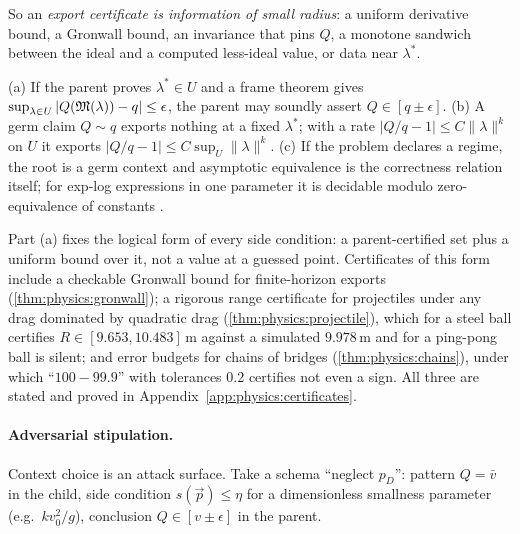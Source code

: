 So an \emph{export certificate is information of small radius}: a uniform derivative
bound, a Gronwall bound, an invariance that pins $Q$, a monotone sandwich between the
ideal and a computed less-ideal value, or data near $\lambda^*$.

\begin{theorem}\label{thm:physics:neighbourhood}
(a) If the parent proves $\lambda^*\in U$ and a frame theorem gives
$\sup_{\lambda\in U}|Q(\mathfrak{M}(\lambda))-q|\le\epsilon$, the parent may soundly assert $Q\in[q\pm\epsilon]$.
(b) A germ claim $Q\sim q$ exports nothing at a fixed $\lambda^*$; with a rate
$|Q/q-1|\le C\|\lambda\|^k$ on $U$ it exports $|Q/q-1|\le C\sup_U\|\lambda\|^k$. (c) If the
problem declares a regime, the root is a germ context and asymptotic equivalence is the
correctness relation itself; for exp-log expressions in one parameter it is decidable
modulo zero-equivalence of constants \citep{gruntz1996computing,richardson1968some}.
\end{theorem}

Part (a) fixes the logical form of every side condition: a parent-certified set plus a
uniform bound over it, not a value at a guessed point. Certificates of this form include a
checkable Gronwall bound for finite-horizon exports (\cref{thm:physics:gronwall}); a rigorous range
certificate for projectiles under any drag dominated by quadratic drag
(\cref{thm:physics:projectile}), which for a steel ball certifies $R\in[9.653,10.483]$\,m
against a simulated $9.978$\,m and for a ping-pong ball is silent; and error budgets for
chains of bridges (\cref{thm:physics:chains}), under which ``$100-99.9$'' with tolerances
$0.2$ certifies not even a sign. All three are stated and proved in
Appendix~\ref{app:physics:certificates}.

\paragraph{Adversarial stipulation.} Context choice is an attack surface. Take a schema
``neglect $p_D$'': pattern $Q=\bar v$ in the child, side condition $s(\vec p)\le\eta$ for a
dimensionless smallness parameter (e.g.\ $kv_0^2/g$), conclusion $Q\in[v\pm\epsilon]$ in the
parent.

